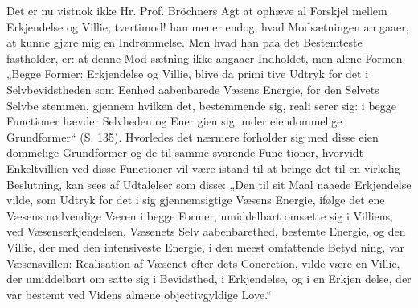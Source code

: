 \documentclass[12pt]{book}
\newcommand{\opage}[1]{\marginnote{\footnotesize\textit{[#1]}}}
\begin{document}
Det er nu vistnok ikke Hr. Prof. Bröchners Agt
at ophæve al Forskjel mellem Erkjendelse og Villie;
tvertimod! han mener endog, hvad Modsætningen an\-%
gaaer, at kunne gjøre mig en Indrømmelse. Men hvad
han paa det Bestemteste fastholder, er: at denne Mod\-%
sætning ikke angaaer Indholdet, men alene Formen.
„Begge Former: Erkjendelse og Villie, blive da primi\-%
tive Udtryk for det i Selvbevidstheden som Eenhed
aabenbarede Væsens Energie, for den Selvets Selvbe\-%
stemmen, gjennem hvilken det, bestemmende sig, reali\-%
serer sig: i begge Functioner hævder Selvheden og Ener\-%
gien sig under eiendommelige Grundformer“ (S. 135).
Hvorledes det nærmere forholder sig med disse eien\-%
dommelige Grundformer og de til samme svarende Func\-%
tioner, hvorvidt Enkeltvillien ved disse Functioner vil
være istand til at bringe det til en virkelig Beslutning,
kan sees af Udtalelser som disse: „Den til sit Maal
naaede Erkjendelse vilde, som Udtryk for det i sig
\opage{37}\setcounter{footnote}{0}%
gjennemsigtige Væsens Energie, ifølge det ene Væsens
nødvendige Væren i begge Former, umiddelbart omsætte
sig i Villiens, ved Væsenserkjendelsen, Væsenets Selv\-%
aabenbarethed, bestemte Energie, og den Villie, der med
den intensiveste Energie, i den meest omfattende Betyd\-%
ning, var Væsensvillen: Realisation af Væsenet efter dets
Concretion, vilde være en Villie, der umiddelbart om\-%
satte sig i Bevidsthed, i Erkjendelse, og i en Erkjen\-%
delse, der var bestemt ved Videns almene objectivgyldige
Love.“
\end{document}
